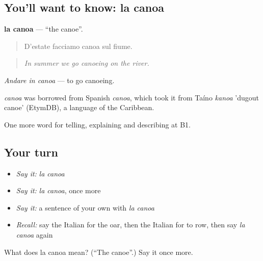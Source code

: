 \subsection*{You'll want to know: la canoa}
\textbf{la canoa} — \textquotedblleft{}the canoe\textquotedblright{}.

\begin{quote}
D'estate facciamo canoa sul fiume.
\end{quote}

\begin{quote}
\emph{In summer we go canoeing on the river.}
\end{quote}

\emph{Andare in canoa} — to go canoeing.

\begin{cousinweb}
\emph{canoa} was borrowed from Spanish \emph{canoa}, which took it from Taíno \emph{kanoa} 'dugout canoe' (EtymDB), a language of the Caribbean.
\end{cousinweb}

\begin{grammarlens}[title={What you've built}]
One more word for telling, explaining and describing at B1.
\end{grammarlens}

\subsection*{Your turn}
\begin{itemize}
\raggedright
  \item \emph{Say it:} \emph{la canoa}
  \item \emph{Say it:} \emph{la canoa}, once more
  \item \emph{Say it:} a sentence of your own with \emph{la canoa}
  \item \emph{Recall:} say the Italian for the oar, then the Italian for to row, then say \emph{la canoa} again
\end{itemize}

\begin{tcolorbox}[breakable,colback=teal!4,colframe=teal!35!black,title={Before you move on}]
What does la canoa mean? (\textquotedblleft{}The canoe\textquotedblright{}.) Say it once more.
\end{tcolorbox}
